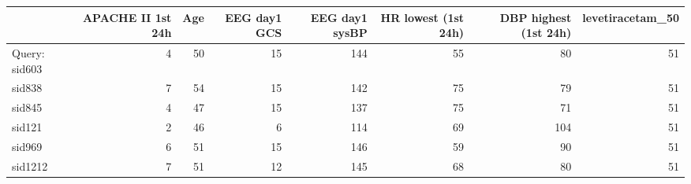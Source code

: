 \begin{tabular}{lrrrrrrr}
\toprule
{} &  APACHE II 1st 24h &  Age &  EEG day1 GCS &  EEG day1 sysBP &  HR lowest (1st 24h) &  DBP highest (1st 24h) &  levetiracetam\_50 \\
\midrule
Query: sid603  &                  4 &   50 &            15 &             144 &                   55 &                     80 &                51 \\
sid838  &                  7 &   54 &            15 &             142 &                   75 &                     79 &                51 \\
sid845  &                  4 &   47 &            15 &             137 &                   75 &                     71 &                51 \\
sid121  &                  2 &   46 &             6 &             114 &                   69 &                    104 &                51 \\
sid969  &                  6 &   51 &            15 &             146 &                   59 &                     90 &                51 \\
sid1212 &                  7 &   51 &            12 &             145 &                   68 &                     80 &                51 \\
\bottomrule
\end{tabular}
